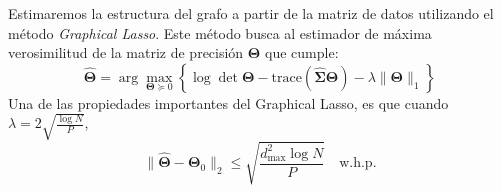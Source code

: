 \documentclass{article}
\begin{document}
Estimaremos la estructura del grafo a partir de la matriz de datos utilizando el método \textit{Graphical Lasso}. Este método busca al estimador 
de máxima verosimilitud de la matriz de precisión $\boldsymbol{\Theta}$ que cumple:
\begin{equation}
\hat{\boldsymbol{\Theta}} = \arg \max_{\boldsymbol{\Theta} \succeq 0} \left\{ \log \det \boldsymbol{\Theta} - \text{trace}(\hat{\boldsymbol{\Sigma}} \boldsymbol{\Theta}) - \lambda \|\boldsymbol{\Theta}\|_1 \right\}
\end{equation}
Una de las propiedades importantes del Graphical Lasso, es que cuando $\lambda =  2\sqrt{\frac{\log N}{P}}$,
\begin{equation*}
    \|\hat{\boldsymbol{\Theta}} - \boldsymbol{\Theta}_0\|_2 \leq \sqrt{\frac{d_{\max}^2 \log N}{P}} \quad \text{w.h.p.}
\end{equation*}
\end{document}
